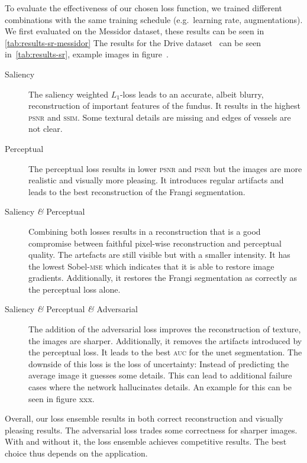 \documentclass{scrartcl}
\begin{document}
To evaluate the effectiveness of our chosen loss function, we trained different combinations with the same training schedule (e.g.\ learning rate, augmentations).
We first evaluated on the Messidor dataset, these results can be seen in \cref{tab:results-sr-messidor}
The results for the Drive dataset~\cite{Drive} can be seen in~\cref{tab:results-sr}, example images in figure~.
\begin{description}
\item[Saliency] The saliency weighted $L_1$-loss leads to an accurate, albeit blurry, reconstruction of important features of the fundus.
  It results in the highest \textsc{psnr} and \textsc{ssim}.
  Some textural details are missing and edges of vessels are not clear.
\item[Perceptual] The perceptual loss results in lower \textsc{psnr} and \textsc{psnr} but the images are more realistic and visually more pleasing.
  It introduces regular artifacts and leads to the best reconstruction of the Frangi segmentation.
\item[Saliency \textit{\&} Perceptual] Combining both losses results in a reconstruction that is a good compromise between faithful pixel-wise reconstruction and perceptual quality.
  The artefacts are still visible but with a smaller intensity.
  It has the lowest Sobel-\textsc{mse} which indicates that it is able to restore image gradients.
  Additionally, it restores the Frangi segmentation as correctly as the perceptual loss alone.
\item[Saliency \textit{\&} Perceptual \textit{\&} Adversarial]
  The addition of the adversarial loss improves the reconstruction of texture, the images are sharper.
  Additionally, it removes the artifacts introduced by the perceptual loss.
  It leads to the best \textsc{auc} for the unet segmentation.
  The downside of this loss is the loss of uncertainty:
  Instead of predicting the average image it guesses some details.
  This can lead to additional failure cases where the network hallucinates details.
  An example for this can be seen in figure xxx.
\end{description}
Overall, our loss ensemble results in both correct reconstruction and visually pleasing results.
The adversarial loss trades some correctness for sharper images.
With and without it, the loss ensemble achieves competitive results.
The best choice thus depends on the application.
\end{document}
